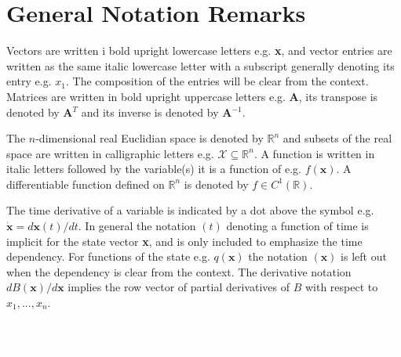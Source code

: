 \section*{General Notation Remarks}
\vspace{0.1cm}

Vectors are written i bold upright lowercase letters e.g. \textbf{x}, and vector entries are written as the same italic lowercase letter with a subscript generally denoting its entry e.g. $x_1$. The composition of the entries will be clear from the context.
Matrices are written in bold upright uppercase letters e.g. \textbf{A}, its transpose is denoted by \textbf{A}$^T$ and its inverse  is denoted by \textbf{A}$^{-1}$.

The $n$-dimensional real Euclidian space is denoted by $\mathbb{R}^n$ and subsets of the real space are written in calligraphic letters e.g. $\mathcal{X}\subseteq \mathbb{R}^n$. 
A function is written in italic letters followed by the variable(s) it is a function of e.g. $f(\mathbf{x})$. A differentiable function defined on $\mathbb{R}^n$ is denoted by $f\in C^1(\mathbb{R})$.

The time derivative of a variable is indicated by a dot above the symbol e.g. $\dot{\mathbf{x}} = d\mathbf{x}(t)/dt$. In general the notation $(t)$ denoting a function of time is implicit for the state vector \textbf{x}, and is only included to emphasize the time dependency. For functions of the state e.g. $q(\mathbf{x})$  the notation $(\mathbf{x})$ is left out when the dependency is clear from the context. The derivative notation $dB(\mathbf{x})/d\mathbf{x}$ implies the row vector of partial derivatives of $B$ with respect to $x_1,...,x_n$.









\textcolor{white}{%
	\gls{injective_func} \gls{surjective_func} \gls{bijective_func}  \gls{compact_space}  \gls{extrinsic} \gls{intrinsic} \gls{tcp} \gls{Ts} \gls{y} \gls{radius_vec} \gls{center_vec}}